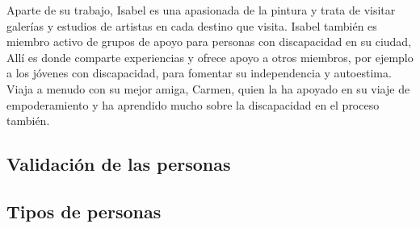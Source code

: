 Aparte de su trabajo, Isabel es una apasionada de la pintura y trata de visitar galerías y estudios de artistas en cada destino que visita. Isabel también es miembro activo de grupos de apoyo para personas con discapacidad en su ciudad, Allí es donde comparte experiencias y ofrece apoyo a otros miembros, por ejemplo a los jóvenes con discapacidad, para fomentar su independencia y autoestima.
Viaja a menudo con su mejor amiga, Carmen, quien la ha apoyado en su viaje de empoderamiento y ha aprendido mucho sobre la discapacidad en el proceso también.

\subsection{Validación de las personas}
\subsection{Tipos de personas}
